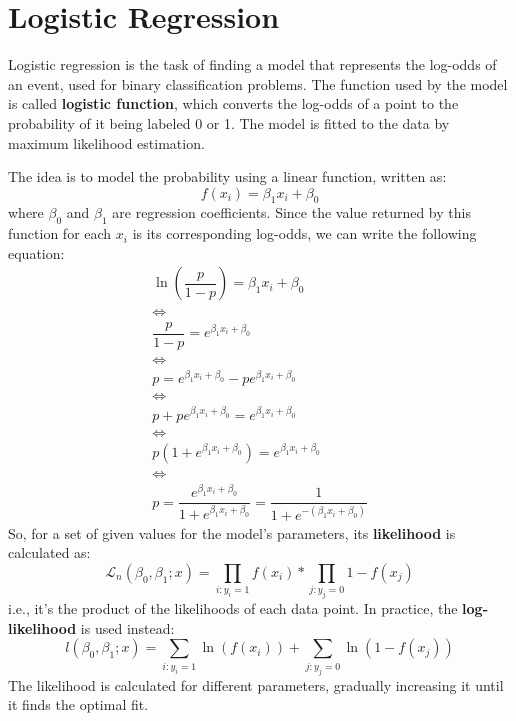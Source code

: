 \chapter{Logistic Regression}

Logistic regression is the task of finding a model that represents the log-odds of an event, used for binary classification problems. The function used by the model is called \textbf{logistic function}, which converts the log-odds of a point to the probability of it being labeled 0 or 1. The model is fitted to the data by maximum likelihood estimation.

The idea is to model the probability using a linear function, written as:
\begin{equation*}
    f(x_i) = \beta_1 x_i + \beta_0
\end{equation*}
where $\beta_0$ and $\beta_1$ are regression coefficients. Since the value returned by this function for each $x_i$ is its corresponding log-odds, we can write the following equation:
\begin{gather*}
    \ln \left (\dfrac{p}{1-p} \right ) = \beta_1 x_i + \beta_0 \\
    \iff \\
    \dfrac{p}{1-p} = e^{\beta_1 x_i + \beta_0} \\
    \iff \\
    p = e^{\beta_1 x_i + \beta_0} - p e^{\beta_1 x_i + \beta_0} \\
    \iff \\
    p + p e^{\beta_1 x_i + \beta_0} = e^{\beta_1 x_i + \beta_0} \\
    \iff \\
    p (1 + e^{\beta_1 x_i + \beta_0}) = e^{\beta_1 x_i + \beta_0} \\
    \iff \\
    \boxed{p = \dfrac{e^{\beta_1 x_i + \beta_0}}{1 + e^{\beta_1 x_i + \beta_0}} = \dfrac{1}{1 + e^{-(\beta_1 x_i + \beta_0)}}}
\end{gather*}
So, for a set of given values for the model's parameters, its \textbf{likelihood} is calculated as:
\begin{equation*}
    \mathcal{L}_n(\beta_0, \beta_1; x) = \prod_{i: y_i = 1} f(x_i) * \prod_{j: y_j = 0} 1 - f(x_j)
\end{equation*}
i.e., it's the product of the likelihoods of each data point. In practice, the \textbf{log-likelihood} is used instead:
\begin{equation*}
    l(\beta_0, \beta_1; x) = \sum_{i: y_i = 1} \ln(f(x_i)) + \sum_{j: y_j = 0} \ln(1 - f(x_j))
\end{equation*}
The likelihood is calculated for different parameters, gradually increasing it until it finds the optimal fit.